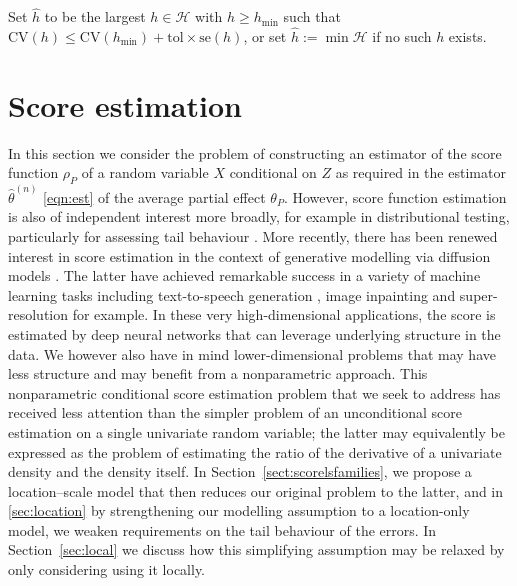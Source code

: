 \documentclass[aos]{imsart}
\begin{document}
\begin{algorithm}[h]
		Set $\hat{h}$ to be the largest $h \in \mathcal{H}$ with $h \geq h_{\min}$ such that $\text{CV}(h) \leq \text{CV}(h_{\min}) + \text{tol} \times \text{se}(h)$, or set $\hat{h} := \min \mathcal{H}$ if no such $h$ exists.
		\caption{Cross validation selection procedure for the resmoothing bandwidth.}
  \label{alg:resmooth}
	\end{algorithm}
	
	
	
	
	\section{Score estimation}
	\label{sect:score}
	In this section we consider the problem of constructing an estimator of the score function $\rho_P$ of a random variable $X$ conditional on $Z$ as required in the estimator $\hat{\theta}^{(n)}$ \eqref{eqn:est} of the average partial effect $\theta_P$. However, score function estimation is also of independent interest more broadly, for example in distributional testing, particularly for assessing tail behaviour \citep{BeraScore}. More recently, there has been renewed interest in score estimation in the context of  generative modelling via diffusion models \citep{song2020score}.
	 The latter have achieved remarkable success in a variety of machine learning tasks including text-to-speech generation \citep{popov2021diffusion}, image inpainting and super-resolution \citep{song2021solving} for example. In these very high-dimensional applications, the score is estimated by deep neural networks that can leverage underlying structure in the data. We however also have in mind lower-dimensional problems that may have less structure and may benefit from a nonparametric approach.	
	This nonparametric conditional score estimation problem that we seek to address has received less attention than the simpler problem of an unconditional score estimation on a single univariate random variable; the latter may equivalently be expressed as the problem of estimating the ratio of the derivative of a univariate density and the density itself. In Section~\ref{sect:scorelsfamilies}, we propose a location--scale model that then reduces our original problem to the latter, and  in \ref{sec:location} by strengthening our modelling assumption to a location-only model, we weaken requirements on the tail behaviour of the errors. In Section~\ref{sec:local} we discuss how this simplifying assumption may be relaxed by only considering using it locally.
	
\end{document}
